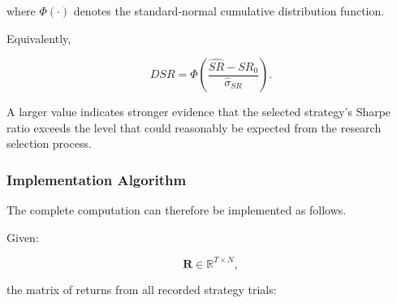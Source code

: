 \documentclass[11pt,a4paper]{article}
\begin{document}
where $\Phi(\cdot)$ denotes the standard-normal cumulative distribution
function.

Equivalently,

\begin{equation}
\boxed{
DSR
=
\Phi
\left(
\frac{
\widehat{SR}-SR_0
}{
\widehat{\sigma}_{SR}
}
\right).
}
\end{equation}

A larger value indicates stronger evidence that the selected strategy's Sharpe
ratio exceeds the level that could reasonably be expected from the research
selection process.


\subsubsection{Implementation Algorithm}

The complete computation can therefore be implemented as follows.

Given:

\begin{equation}
\mathbf{R}
\in
\mathbb{R}^{T\times N},
\end{equation}

the matrix of returns from all recorded strategy trials:
\end{document}
